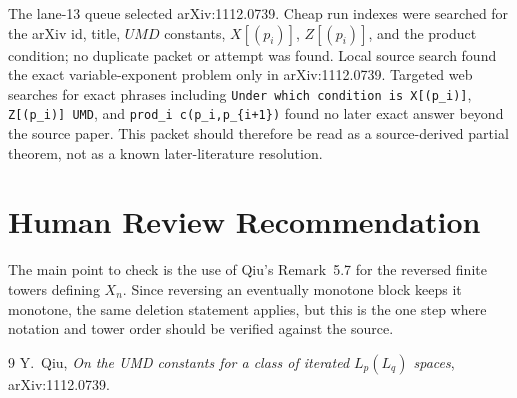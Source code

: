 \documentclass[11pt]{article}
\begin{document}
The lane-13 queue selected arXiv:1112.0739.  Cheap run indexes were searched
for the arXiv id, title, \(UMD\) constants, \(X[(p_i)]\), \(Z[(p_i)]\), and
the product condition; no duplicate packet or attempt was found.  Local source
search found the exact variable-exponent problem only in arXiv:1112.0739.
Targeted web searches for exact phrases including
\texttt{Under which condition is X[(p\_i)]}, \texttt{Z[(p\_i)] UMD}, and
\texttt{prod\_i c(p\_i,p\_\{i+1\})} found no later exact answer beyond the
source paper.  This packet should therefore be read as a source-derived
partial theorem, not as a known later-literature resolution.

\section*{Human Review Recommendation}

The main point to check is the use of Qiu's Remark~5.7 for the reversed
finite towers defining \(X_n\).  Since reversing an eventually monotone block
keeps it monotone, the same deletion statement applies, but this is the one
step where notation and tower order should be verified against the source.

\begin{thebibliography}{9}
Y.~Qiu,
\emph{On the UMD constants for a class of iterated \(L_p(L_q)\) spaces},
arXiv:1112.0739.
\end{thebibliography}
\end{document}
